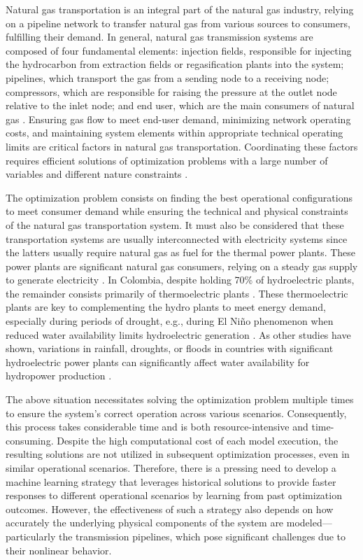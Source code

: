 Natural gas transportation is an integral part of the natural gas industry, relying on a pipeline network to transfer natural gas from various sources to consumers, fulfilling their demand. In general, natural gas transmission systems are composed of four fundamental elements: injection fields, responsible for injecting the hydrocarbon from extraction fields or regasification plants into the system; pipelines, which transport the gas from a sending node to a receiving node; compressors, which are responsible for raising the pressure at the outlet node relative to the inlet node; and end user, which are the main consumers of natural gas \cite{review}. Ensuring gas flow to meet end-user demand, minimizing network operating costs, and maintaining system elements within appropriate technical operating limits are critical factors in natural gas transportation. Coordinating these factors requires efficient solutions of optimization problems with a large number of variables and different nature constraints  \cite{Conejo}.


The optimization problem consists on finding the best operational configurations to meet consumer demand while ensuring the technical and physical constraints of the natural gas transportation system.  It must also be considered that these transportation systems are usually interconnected with electricity systems since the latters usually require natural gas as fuel for the thermal power plants. These power plants are significant natural gas consumers, relying on a steady gas supply to generate electricity \cite{Byeon_Van_Hentenryck_2020}. In Colombia, despite holding 70\% of hydroelectric plants, the remainder consists primarily of thermoelectric plants \cite{Morcillo_Angulo_Franco_2020a}. These thermoelectric plants are key to complementing the hydro plants to meet energy demand, especially during periods of drought, e.g., during El Niño phenomenon when reduced water availability limits hydroelectric generation \cite{droughts_colombia}. As other studies have shown, variations in rainfall, droughts, or floods in countries with significant hydroelectric power plants can significantly affect water availability for hydropower production \cite{Cuartas_Cunha_Alves_Parra_Deusdará_Leal_Costa_Molina_Amore_Broedel_Seluchi_et_al_2022}. 

The above situation necessitates solving the optimization problem multiple times to ensure the system's correct operation across various scenarios. Consequently, this process takes considerable time and is both resource-intensive and time-consuming. Despite the high computational cost of each model execution, the resulting solutions are not utilized in subsequent optimization processes, even in similar operational scenarios. Therefore, there is a pressing need to develop a machine learning strategy that leverages historical solutions to provide faster responses to different operational scenarios by learning from past optimization outcomes. However, the effectiveness of such a strategy also depends on how accurately the underlying physical components of the system are modeled—particularly the transmission pipelines, which pose significant challenges due to their nonlinear behavior.

